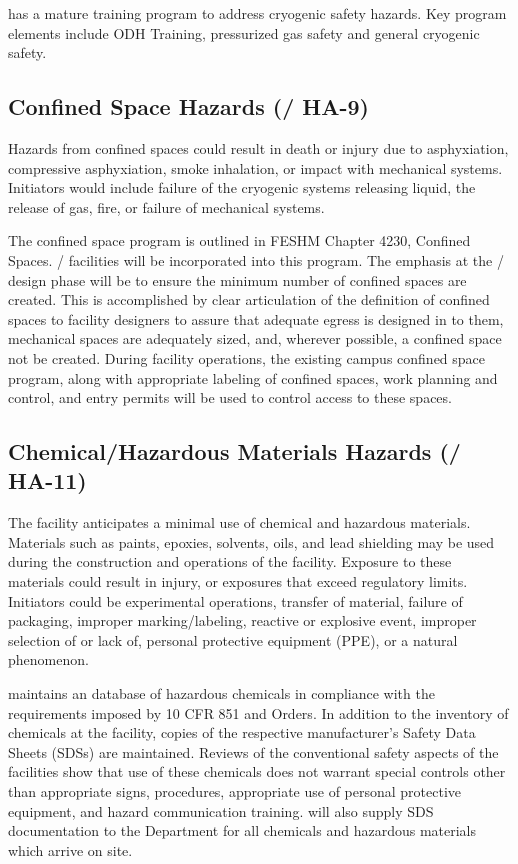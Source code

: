 \fnal has a mature training program to address cryogenic safety
hazards. Key program elements include ODH Training, pressurized gas
safety and general cryogenic safety.


\subsection{Confined Space Hazards (/ HA-9)}

Hazards from confined spaces could result in death or injury due to
asphyxiation, compressive asphyxiation, smoke inhalation, or impact
with mechanical systems. Initiators would include failure of the
cryogenic systems releasing liquid, the release of gas, fire, or
failure of mechanical systems.

The \fnal confined space program is outlined in FESHM Chapter 4230,
Confined Spaces. / facilities will be incorporated into this
program. The emphasis at the / design phase will be to ensure
the minimum number of confined spaces are created. This is
accomplished by clear articulation of the definition of confined
spaces to facility designers to assure that adequate egress is
designed in to them, mechanical spaces are adequately sized, and,
wherever possible, a confined space not be created. During facility
operations, the existing campus confined space program, along with
appropriate labeling of confined spaces, work planning and control,
and entry permits will be used to control access to these spaces.


\subsection{Chemical/Hazardous Materials Hazards (/ HA-11)}

The  facility anticipates a minimal use of chemical and hazardous
materials. Materials such as paints, epoxies, solvents, oils, and lead
shielding may be used during the construction and operations of the
facility. Exposure to these materials could result in injury, or
exposures that exceed regulatory limits. Initiators could be
experimental operations, transfer of material, failure of packaging,
improper marking/labeling, reactive or explosive event, improper
selection of or lack of, personal protective equipment (PPE), or a
natural phenomenon.

\fnal maintains an database of hazardous chemicals in compliance
with the requirements imposed by 10 CFR 851 and  Orders. In
addition to the inventory of chemicals at the facility, copies of the
respective manufacturer's Safety Data Sheets (SDSs) are
maintained. Reviews of the conventional safety aspects of the
facilities show that use of these chemicals does not warrant special
controls other than appropriate signs, procedures, appropriate use of
personal protective equipment, and hazard communication training. 
will also supply SDS documentation to the \surf {} Department for all
chemicals and hazardous materials which arrive on site.

